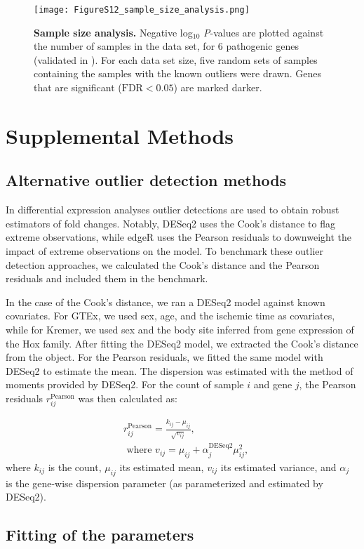 \documentclass[a4paper,12pt]{article}
\begin{document}
\begin{figure}[h]
	\centering
	\texttt{[image: FigureS12\_sample\_size\_analysis.png]}
	\caption{\textbf{Sample size analysis.} Negative log$_{10}$ \textit{P}-values are plotted against the number of samples in the data set, for 6 pathogenic genes (validated in \citet{Kremer2017}). For each data set size, five random sets of samples containing the samples with the known outliers were drawn. Genes that are significant ($\text{FDR}<0.05$) are marked darker.}
\end{figure}
\pagebreak

\FloatBarrier


\section{Supplemental Methods}

\subsection{Alternative outlier detection methods}

In differential expression analyses outlier detections are used to obtain robust estimators of fold changes. 
Notably, DESeq2\cite{Love2014} uses the Cook's distance to flag extreme observations, while edgeR\cite{Zhou2014}
uses the Pearson residuals to downweight the impact of extreme observations on the model. To benchmark these
outlier detection approaches, we calculated the Cook's distance and the Pearson residuals and included them in the benchmark.

In the case of the Cook's distance, we ran a DESeq2 model against known covariates. 
For GTEx, we used sex, age, and the ischemic time as covariates, while for Kremer, we used sex and the body site inferred from gene expression of the Hox family.
After fitting the DESeq2 model, we extracted the Cook's distance from the object. For the Pearson residuals, we fitted the same model with DESeq2 to estimate the mean. The dispersion was estimated with the method of moments provided by DESeq2. For the count of sample $i$ and gene $j$, the Pearson residuals $r^{\text{Pearson}}_{ij}$ was then calculated as:

\begin{align*}
  &r^{\text{Pearson}}_{ij} = \frac{k_{ij} - \mu_{ij}}{\sqrt{v_{ij}}} ,\\
   &\text{   where }v_{ij} = \mu_{ij} + \alpha_{j}^{\text{DESeq2}} \mu_{ij}^2 ,
\end{align*}
where $k_{ij}$ is the count, $\mu_{ij}$ its  estimated mean, $v_{ij}$ its estimated variance, and $\alpha_j$ is the gene-wise dispersion parameter (as parameterized and estimated by DESeq2).

\subsection{Fitting of the parameters}






\end{document}
